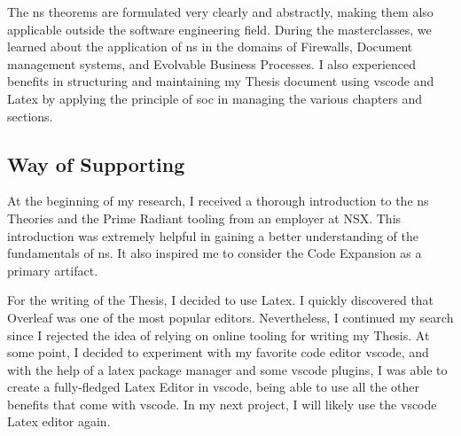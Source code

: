 The \gls{ns} theorems are formulated very clearly and abstractly, making them also
applicable outside the software engineering field. During the masterclasses, we learned
about the application of \gls{ns} in the domains of Firewalls, Document management
systems, and Evolvable Business Processes. I also experienced benefits in structuring and
maintaining my Thesis document using \gls{vscode} and Latex by applying the principle of
\gls{soc} in managing the various chapters and sections. 

\subsection{Way of Supporting}

At the beginning of my research, I received a thorough introduction to the \gls{ns}
Theories and the Prime Radiant tooling from an employer at NSX. This introduction was
extremely helpful in gaining a better understanding of the fundamentals of \gls{ns}. It
also inspired me to consider the Code Expansion as a primary artifact. 

For the writing of the Thesis, I decided to use Latex. I quickly discovered that Overleaf
was one of the most popular editors. Nevertheless, I continued my search since I rejected
the idea of relying on online tooling for writing my Thesis. At some point, I decided to
experiment with my favorite code editor \gls{vscode}, and with the help of a latex package
manager and some \gls{vscode} plugins, I was able to create a fully-fledged Latex Editor
in \gls{vscode}, being able to use all the other benefits that come with \gls{vscode}. In
my next project, I will likely use the \gls{vscode} Latex editor again.
